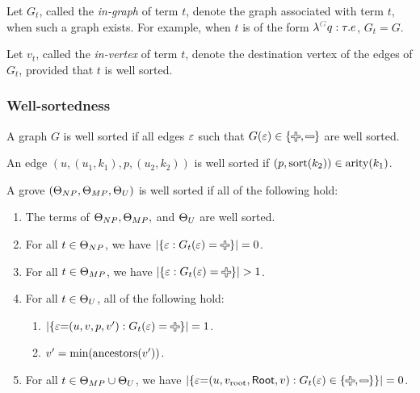 Let $G_t$, called the \emph{in-graph} of term $t$,
denote the graph associated with term $t$, when such a graph exists.
For example, when $t$ is of the form $\eFun{G}{q}{\tau}{e}$, $G_t = G$.

Let $v_t$, called the \emph{in-vertex} of term $t$,
denote the destination vertex of the edges of $G_t$,
provided that $t$ is well sorted.


\subsubsection{Well-sortedness}

\begin{definition}
  A graph $G$ is well sorted if all edges $\e$ such that $G(\e) \in \{\Plus, \Minus\}$ are well sorted.
\end{definition}

\begin{definition}
  An edge $(u, (u_1, k_1), p, (u_2, k_2))$ is well sorted if $(p, \sort{k_2}) \in \arity{k_1}$.
\end{definition}

\begin{definition}
  A grove $(\Set[NP], \Set[MP], \Set[U])$ is well sorted if all of the following hold:
  \begin{enumerate}
    \item The terms of $\Set[NP], \Set[MP],$ and $\Set[U]$ are well sorted.
    \item For all $t \in \Set[NP]$,
      we have $\SizeOf{\SetOf{\e \SuchThat{G_t(\e) = \Plus}}} = 0$.
    \item For all $t \in \Set[MP]$,
      we have $\SizeOf{\SetOf{\e \SuchThat{G_t(\e) = \Plus}}} > 1$.
    \item For all $t \in \Set[U]$, all of the following hold:
      \begin{enumerate}
        \item $\SizeOf{\SetOf{\e{=}(u, v, p, v') \SuchThat{G_t(\e) = \Plus}}} = 1$.
        \item $v' = \min{\ancestors{v'}}$.
      \end{enumerate}
    \item For all $t \in \Set[MP] \cup \Set[U]$,
      we have $\SizeOf{\SetOf{\e{=}(u, \rootVertex, \Root, v) \SuchThat{G_t(\e) \in \SetOf{\Plus, \Minus}}}} = 0$.
  \end{enumerate}
\end{definition}

